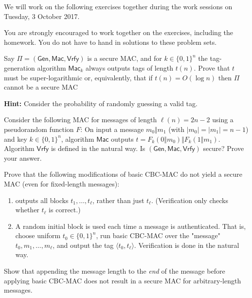 \documentclass[a4paper,10pt,landscape,twocolumn]{scrartcl}
\newcommand\worksession{Tuesday, 3 October 2017}
\begin{document}
\problems

{\sffamily\noindent
We will work on the following exercises together during the work sessions on \worksession.

You are strongly encouraged to work together on the exercises, including the homework. You do not have to hand in solutions to these problem sets.}

\begin{exercise}
Say $\Pi=(\mathsf{Gen},\mathsf{Mac},\mathsf{Vrfy})$ is a secure MAC, and for $k\in\{0,1\}^n$ the tag-generation algorithm $\mathsf{Mac}_k$ always outputs tags of length $t(n)$. Prove that $t$ must be super-logarithmic or, equivalently, that if $t(n)=O(\log n)$ then $\Pi$ cannot be a secure MAC

\textbf{Hint:} Consider the probability of randomly guessing a valid tag.
\end{exercise}

\begin{exercise}
Consider the following MAC for messages of length $\ell(n)=2n-2$ using a pseudorandom function $F$: On input a message $m_0\Vert m_1$ (with $|m_0|=|m_1|=n-1$) and key $k\in\{0,1\}^n$, algorithm $\mathsf{Mac}$ outputs $t=F_k(0\Vert m_0)\Vert F_k(1\Vert m_1)$. Algorithm $\mathsf{Vrfy}$ is defined in the natural way. Is $(\mathsf{Gen},\mathsf{Mac},\mathsf{Vrfy})$ secure? Prove your answer.
\end{exercise}

\begin{exercise}
  Prove that the following modifications of basic CBC-MAC do not yield a
secure MAC (even for fixed-length messages):
\begin{enumerate}
\item \mac outputs all blocks $t_1, \ldots , t_\ell$, rather than just $t_\ell$. (Verification only checks whether $t_\ell$ is correct.)
\item A random initial block is used each time a message is
  authenticated. That is, choose uniform $t_0 \in \{0, 1\}^n$, run
  basic CBC-MAC over the "message" $t_0, m_1, \ldots , m_\ell$, and
  output the tag $\langle t_0, t_\ell \rangle$. Verification is done in the natural way.
\end{enumerate}
\end{exercise}


\begin{bonusexercise}
Show that appending the message length to the \emph{end} of the message before applying basic CBC-MAC does not result in a secure MAC for arbitrary-length messages.
\end{bonusexercise}
\end{document}
